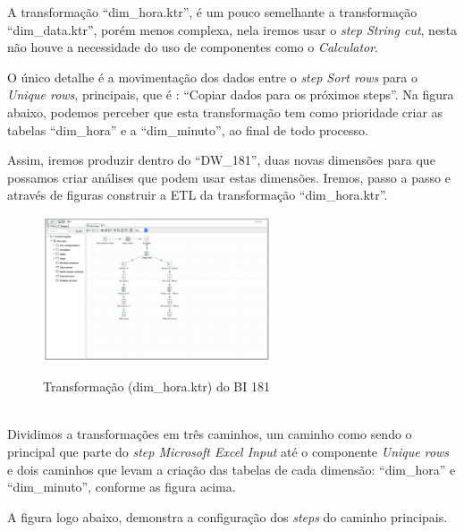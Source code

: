 A transforma\c{c}\~{a}o ``dim\_hora.ktr'', \'{e} um pouco semelhante a transforma\c{c}\~{a}o ``dim\_data.ktr'', por\'{e}m menos complexa, 
nela iremos usar o \textit{step String cut}, nesta n\~{a}o houve a necessidade do uso de componentes como o \textit{Calculator}. 

O único detalhe \'{e} a movimenta\c{c}\~{a}o dos dados entre o \textit{step Sort rows} para o \textit{Unique rows}, principais, 
que \'{e} : ``Copiar dados para os pr\'{o}ximos steps''. Na figura abaixo, podemos perceber que esta transforma\c{c}\~{a}o tem como 
prioridade criar as tabelas ``dim\_hora'' e a ``dim\_minuto'', ao final de todo processo. 

Assim, iremos produzir dentro do ``DW\_181'', duas novas dimens\~{o}es para que possamos criar an\'{a}lises que podem usar estas dimens\~{o}es.
Iremos, passo a passo e atrav\'{e}s de figuras construir a ETL da transforma\c{c}\~{a}o ``dim\_hora.ktr''.

\begin{figure}[H]
	\vspace*{0,2cm}
    \centering
    \caption{Transforma\c{c}\~{a}o (dim\_hora.ktr) do BI 181}
    \includegraphics[width=0.6\textwidth]{./04-figuras/figura-dim-hora}
    \label{fig:ilustfigresdimhora}
\end{figure}
\vspace*{-0,9cm}
{\raggedright {}} \\

Dividimos a transforma\c{c}\~{o}es em três caminhos, um caminho como sendo o principal que parte do \textit{
step Microsoft Excel Input} at\'{e} o componente \textit{Unique rows} e dois caminhos que  levam a cria\c{c}\~{a}o das tabelas de cada 
dimens\~{a}o: ``dim\_hora'' e ``dim\_minuto'', conforme as figura acima.

A figura logo abaixo, demonstra a configura\c{c}\~{a}o dos \textit{steps} do caminho principais.

